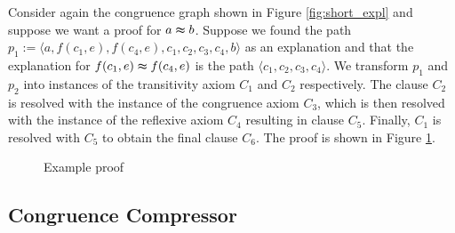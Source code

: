\begin{example}

Consider again the congruence graph shown in Figure \ref{fig:short_expl} and suppose we want a proof for $a \thickapprox b$.
Suppose we found the path $p_1 := \langle  a, f(c_1,e), f(c_4,e), c_1, c_2, c_3, c_4, b \rangle$ as an explanation and that the explanation for $f(c_1,e) \thickapprox f(c_4,e)$ is the path $\langle c_1, c_2, c_3, c_4 \rangle$.
We transform $p_1$ and $p_2$ into instances of the transitivity axiom $C_1$ and $C_2$ respectively. 
The clause $C_2$ is resolved with the instance of the congruence axiom $C_3$, which is then resolved with the instance of the reflexive axiom $C_4$ resulting in clause $C_5$.
Finally, $C_1$ is resolved with $C_5$ to obtain the final clause $C_6$.
The proof is shown in Figure \ref{fig:proofprod}.
%

\begin{figure}[!h]

\caption{Example proof}
\label{fig:proofprod}
\end{figure}


\FloatBarrier

\subsection*{Congruence Compressor}


\end{example}
